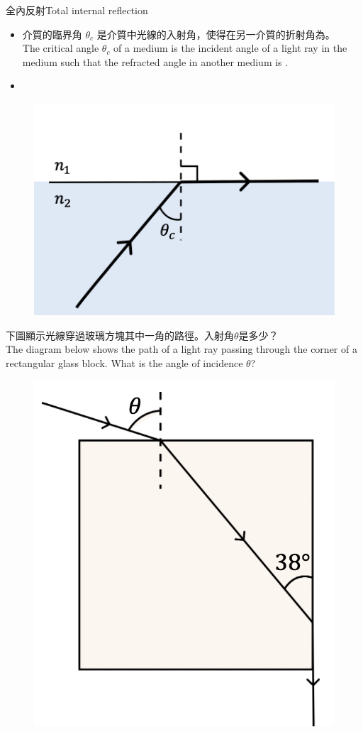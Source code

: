 \documentclass[beamer=true]{standalone}
\begin{document}
\begin{frame}{全內反射Total internal reflection}
    \begin{itemize}
        \item 介質的臨界角 $\theta_c$ 是介質中光線的入射角，使得在另一介質的折射角為。\\The critical angle $\theta_c$ of a medium is the incident angle of a light ray in the medium such that the refracted angle in another medium is .
        \item {}
    \end{itemize}
    \begin{figure}
        \centering
        \includegraphics[width=0.4\linewidth]{assets/dd209i32.png}
    \end{figure}
    
\end{frame}

\begin{eg}
    下圖顯示光線穿過玻璃方塊其中一角的路徑。入射角$\theta$是多少？\\The diagram below shows the path of a light ray passing through the corner of a rectangular glass block. What is the angle of incidence $\theta$?
    \begin{figure}
       \raggedleft
        \includegraphics[width=0.35\linewidth]{assets/oij12i21.png}
    \end{figure}
\end{eg}
\end{document}
